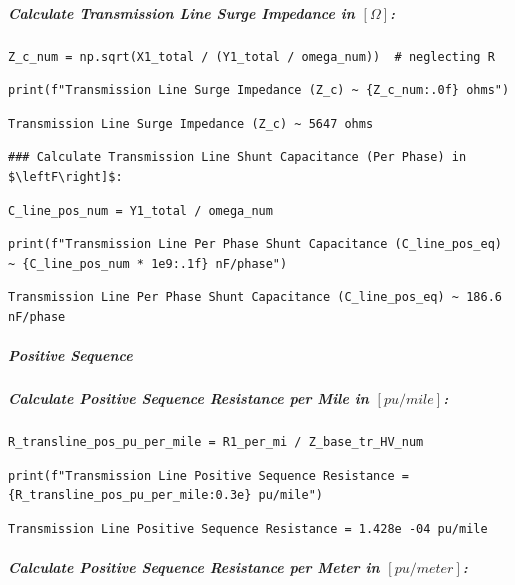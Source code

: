 \subparagraph{Calculate Transmission Line Surge Impedance in $\left[\Omega\right]$:}

\begin{verbatim}
Z_c_num = np.sqrt(X1_total / (Y1_total / omega_num))  # neglecting R
\end{verbatim}

\begin{verbatim}
print(f"Transmission Line Surge Impedance (Z_c) ~ {Z_c_num:.0f} ohms")
\end{verbatim}

\begin{verbatim}
Transmission Line Surge Impedance (Z_c) ~ 5647 ohms
\end{verbatim}

\begin{verbatim}
### Calculate Transmission Line Shunt Capacitance (Per Phase) in $\leftF\right]$:
\end{verbatim}

\begin{verbatim}
C_line_pos_num = Y1_total / omega_num
\end{verbatim}

\begin{verbatim}
print(f"Transmission Line Per Phase Shunt Capacitance (C_line_pos_eq) ~ {C_line_pos_num * 1e9:.1f} nF/phase")
\end{verbatim}

\begin{verbatim}
Transmission Line Per Phase Shunt Capacitance (C_line_pos_eq) ~ 186.6 nF/phase
\end{verbatim}

\subparagraph{Positive Sequence}

\subparagraph{Calculate Positive Sequence Resistance per Mile in $\left[pu/mile\right]$:}

\begin{verbatim}
R_transline_pos_pu_per_mile = R1_per_mi / Z_base_tr_HV_num
\end{verbatim}

\begin{verbatim}
print(f"Transmission Line Positive Sequence Resistance = {R_transline_pos_pu_per_mile:0.3e} pu/mile")
\end{verbatim}

\begin{verbatim}
Transmission Line Positive Sequence Resistance = 1.428e -04 pu/mile
\end{verbatim}

\subparagraph{Calculate Positive Sequence Resistance per Meter in $[pu/meter]$:}

